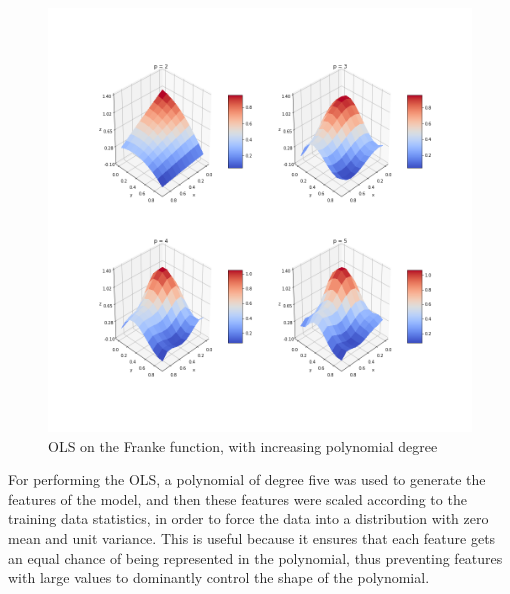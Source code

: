 \documentclass{article}
\begin{document}
\begin{figure}[h]
\includegraphics[scale=0.35]{Plots/frankePlots.png}
\caption{OLS on the Franke function, with increasing polynomial degree}
\end{figure}

For performing the OLS, a polynomial of degree five was used to generate the features of the model, and then these features were scaled according to the training data statistics, in order to force the data into a distribution with zero mean and unit variance. This is useful because it ensures that each feature gets an equal chance of being represented in the polynomial, thus preventing features with large values to dominantly control the shape of the polynomial.
\end{document}
